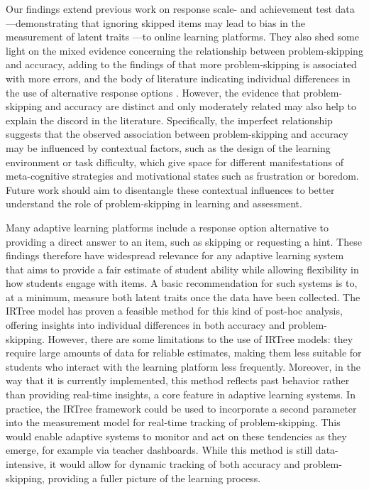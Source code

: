 \documentclass[12pt]{article}
\begin{document}
Our findings extend previous work on response scale- and achievement test data---demonstrating that ignoring skipped items may lead to bias in the measurement of latent traits \parencite{holman2005modelling, pohl2014dealing, huang2020mixture, okumura2014empirical, debeer2017modeling}---to online learning platforms. They also shed some light on the mixed evidence concerning the relationship between problem-skipping and accuracy, adding to the findings of \parencite{norum2024student} that more problem-skipping is associated with more errors, and the body of literature indicating individual differences in the use of alternative response options \parencite{norum2024student, goldin2012learner, goldin2013hints}. However, the evidence that problem-skipping and accuracy are distinct and only moderately related may also help to explain the discord in the literature. Specifically, the imperfect relationship suggests that the observed association between problem-skipping and accuracy may be influenced by contextual factors, such as the design of the learning environment or task difficulty, which give space for different manifestations of meta-cognitive strategies and motivational states such as frustration or boredom. Future work should aim to disentangle these contextual influences to better understand the role of problem-skipping in learning and assessment. 

Many adaptive learning platforms include a response option alternative to providing a direct answer to an item, such as skipping or requesting a hint. These findings therefore have widespread relevance for any adaptive learning system that aims to provide a fair estimate of student ability while allowing flexibility in how students engage with items. A basic recommendation for such systems is to, at a minimum, measure both latent traits once the data have been collected. The IRTree model has proven a feasible method for this kind of post-hoc analysis, offering insights into individual differences in both accuracy and problem-skipping. However, there are some limitations to the use of IRTree models: they require large amounts of data for reliable estimates, making them less suitable for students who interact with the learning platform less frequently. Moreover, in the way that it is currently implemented, this method reflects past behavior rather than providing real-time insights, a core feature in adaptive learning systems. In practice, the IRTree framework could be used to incorporate a second parameter into the measurement model for real-time tracking of problem-skipping. This would enable adaptive systems to monitor and act on these tendencies as they emerge, for example via teacher dashboards. While this method is still data-intensive, it would allow for dynamic tracking of both accuracy and problem-skipping, providing a fuller picture of the learning process. 
\end{document}
